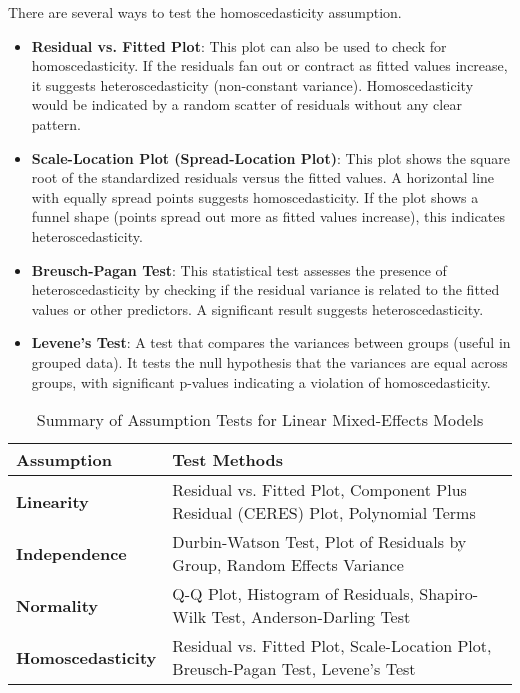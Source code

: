 There are several ways to test the homoscedasticity assumption.
\begin{itemize} 
\item \textbf{Residual vs. Fitted Plot}: This plot can also be used to check for homoscedasticity. If the residuals fan out or contract as fitted values increase, it suggests heteroscedasticity (non-constant variance). Homoscedasticity would be indicated by a random scatter of residuals without any clear pattern.

\item \textbf{Scale-Location Plot (Spread-Location Plot)}: This plot shows the square root of the standardized residuals versus the fitted values. A horizontal line with equally spread points suggests homoscedasticity. If the plot shows a funnel shape (points spread out more as fitted values increase), this indicates heteroscedasticity.

\item \textbf{Breusch-Pagan Test}: This statistical test assesses the presence of heteroscedasticity by checking if the residual variance is related to the fitted values or other predictors. A significant result suggests heteroscedasticity.

\item \textbf{Levene’s Test}: A test that compares the variances between groups (useful in grouped data). It tests the null hypothesis that the variances are equal across groups, with significant p-values indicating a violation of homoscedasticity.
\end{itemize}

\begin{table}[h!]
\centering
\begin{tabular}{|l|l|}
\hline
\textbf{Assumption} & \textbf{Test Methods} \\
\hline
\textbf{Linearity} & Residual vs. Fitted Plot, Component Plus Residual (CERES) Plot, Polynomial Terms \\
\hline
\textbf{Independence} & Durbin-Watson Test, Plot of Residuals by Group, Random Effects Variance \\
\hline
\textbf{Normality} & Q-Q Plot, Histogram of Residuals, Shapiro-Wilk Test, Anderson-Darling Test \\
\hline
\textbf{Homoscedasticity} & Residual vs. Fitted Plot, Scale-Location Plot, Breusch-Pagan Test, Levene’s Test \\
\hline
\end{tabular}
\caption{Summary of Assumption Tests for Linear Mixed-Effects Models}
\end{table}

